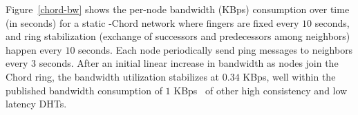{Figure~\ref{chord-bw} shows the per-node bandwidth (KBps) consumption
over time (in seconds) for a static \Sys-Chord network where fingers are
fixed every $10$ seconds, and ring stabilization (exchange of successors
and predecessors among neighbors) happen every $10$ seconds. Each node
periodically send ping messages to neighbors every $3$ seconds. After an
initial linear increase in bandwidth as nodes join the Chord ring, the
bandwidth utilization stabilizes at $0.34$ KBps, well within the
published bandwidth consumption of $1$ KBps~\cite{bamboo} of other high
consistency and low latency DHTs.
}




